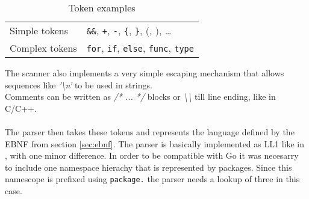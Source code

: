 \documentclass[a4paper]{scrreprt}
\begin{document}
    \begin{table}[htb]
    \centering
    \begin{tabular}{ll}
        \toprule
        Simple tokens & \texttt{\&\&}, \texttt{+}, \texttt{-}, \texttt{\{}, \texttt{\}}, \texttt{$($}, \texttt{$)$}, \dots \\
        Complex tokens & \texttt{for}, \texttt{if}, \texttt{else}, \texttt{func}, \texttt{type} \\
        \bottomrule
    \end{tabular}
    \caption{Token examples}
    \label{tbl:tokens}
    \end{table}

    The scanner also implements a very simple escaping mechanism that allows 
    sequences like \textit{'\textbackslash n'} to be used in strings. \\
    Comments can be written as \textit{/* ... */} blocks or 
    \textit{\textbackslash \textbackslash} till line ending, like in C/C++.
    \\ \\
    The parser then takes these tokens and represents the language defined by
    the EBNF from section \ref{sec:ebnf}. The parser is basically implemented 
    as LL1 like in \cite{wir96}, with one minor difference. In order to be 
    compatible with Go it was necesarry to include one namespace hierachy that 
    is represented by packages. Since this namescope is prefixed 
    using \texttt{package.} the parser needs a lookup of three in this case.
\end{document}
